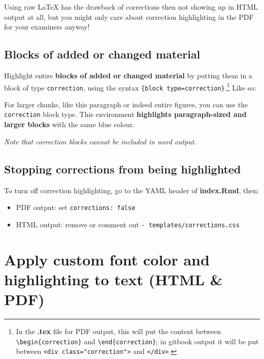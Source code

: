 \documentclass[a4paper, nobind]{templates/ociamthesis}
\providecommand{\tightlist}{%
  \setlength{\itemsep}{0pt}\setlength{\parskip}{0pt}}
\begin{document}
Using raw LaTeX has the drawback of corrections then not showing up in HTML output at all, but you might only care about correction highlighting in the PDF for your examiners anyway!

\hypertarget{blocks-of-added-or-changed-material}{%
\subsection{Blocks of added or changed material}\label{blocks-of-added-or-changed-material}}

Highlight entire \textbf{blocks of added or changed material} by putting them in a block of type \texttt{correction}, using the syntax \texttt{\textasciigrave{}\textasciigrave{}\textasciigrave{}\{block\ type=\textquotesingle{}correction\textquotesingle{}\}}.\footnote{In the \textbf{.tex} file for PDF output, this will put the content between \texttt{\textbackslash{}begin\{correction\}} and \texttt{\textbackslash{}end\{correction\}}; in gitbook output it will be put between \texttt{\textless{}div\ class="correction"\textgreater{}} and \texttt{\textless{}/div\textgreater{}}.}
Like so:

\begin{correction}
For larger chunks, like this paragraph or indeed entire figures, you can
use the \texttt{correction} block type. This environment
\textbf{highlights paragraph-sized and larger blocks} with the same blue
colour.
\end{correction}

\emph{Note that correction blocks cannot be included in word output.}

\hypertarget{stopping-corrections-from-being-highlighted}{%
\subsection{Stopping corrections from being highlighted}\label{stopping-corrections-from-being-highlighted}}

To turn off correction highlighting, go to the YAML header of \textbf{index.Rmd}, then:

\begin{itemize}
\tightlist
\item
  PDF output: set \texttt{corrections:\ false}\\
\item
  HTML output: remove or comment out \texttt{-\ templates/corrections.css}
\end{itemize}

\hypertarget{apply-custom-font-color-and-highlighting-to-text-html-pdf}{%
\section{Apply custom font color and highlighting to text (HTML \& PDF)}\label{apply-custom-font-color-and-highlighting-to-text-html-pdf}}
\end{document}
